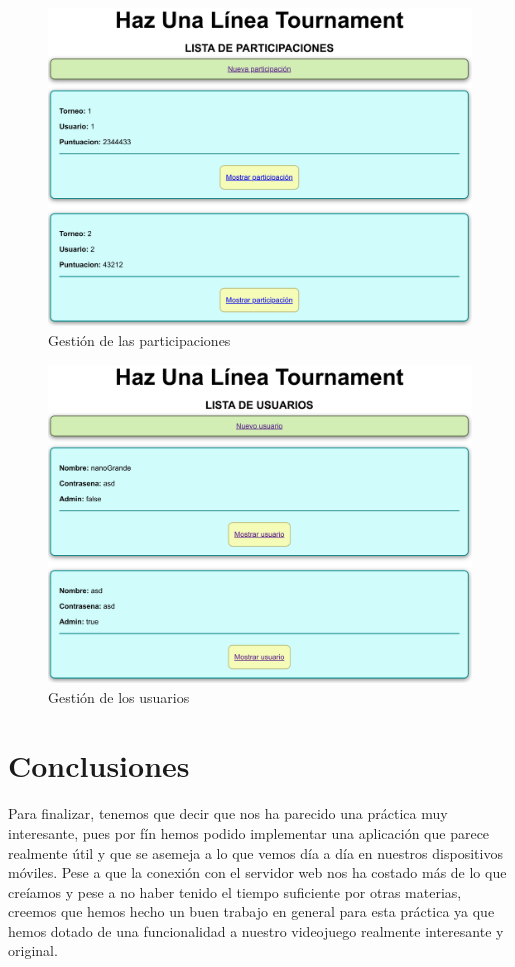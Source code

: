 \documentclass{article}
\begin{document}
\begin{figure}[H]
  \includegraphics[width=\textwidth]{imagenes/adminPart.png}
  \caption{Gestión de las participaciones} 
\end{figure}

\begin{figure}[H]
  \includegraphics[width=\textwidth]{imagenes/adminUsers.png}
  \caption{Gestión de los usuarios} 
\end{figure}

\section{Conclusiones}
Para finalizar, tenemos que decir que nos ha parecido una práctica muy interesante, pues por fín hemos podido implementar una aplicación que parece
realmente útil y que se asemeja a lo que vemos día a día en nuestros dispositivos móviles. Pese a que la conexión con el servidor web nos ha costado más
de lo que creíamos y pese a no haber tenido el tiempo suficiente por otras materias, creemos que hemos hecho un buen trabajo en general para esta práctica ya que
hemos dotado de una funcionalidad a nuestro videojuego realmente interesante y original. 
\end{document}
